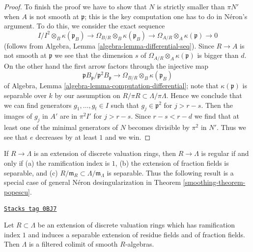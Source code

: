 \begin{proof}
\medskip\noindent
To finish the proof we have to show that $N$ is strictly smaller
than $\pi N'$ when $A$ is not smooth at $\mathfrak p$;
this is the key computation one has to do in N\'eron's argument.
To do this, we consider the exact sequence
$$
I/I^2 \otimes_B \kappa(\mathfrak p_B)
\to \Omega_{B/R} \otimes_B \kappa(\mathfrak p_B)
\to \Omega_{A/R} \otimes_A \kappa(\mathfrak p) \to 0
$$
(follows from Algebra, Lemma \ref{algebra-lemma-differential-seq}).
Since $R \to A$ is not smooth at $\mathfrak p$ we see that the dimension $s$ of
$\Omega_{A/R} \otimes_A \kappa(\mathfrak p)$
is bigger than $d$. On the other hand
the first arrow factors through the injective map
$$
\mathfrak p B_\mathfrak p/\mathfrak p^2 B_\mathfrak p
\to \Omega_{B/R} \otimes_B \kappa(\mathfrak p_B)
$$
of Algebra, Lemma \ref{algebra-lemma-computation-differential};
note that $\kappa(\mathfrak p)$ is separable over $k$
by our assumption on $R/\pi R \subset \Lambda/\pi \Lambda$.
Hence we conclude that we can find generators
$g_1, \ldots, g_t \in I$ such that $g_j \in \mathfrak p^2$
for $j > r - s$. Then the images of $g_j$ in $A'$ are in $\pi^2 I'$
for $j > r - s$. Since $r - s < r - d$
we find that at least one of the minimal generators
of $N$ becomes divisible by $\pi^2$ in $N'$.
Thus we see that $e$ decreases by at least $1$ and we win.
\end{proof}

If $R \to \Lambda$ is an extension of discrete valuation rings,
then $R \to \Lambda$ is regular if and only if
(a) the ramification index is $1$,
(b) the extension of fraction fields is separable, and
(c) $R/\mathfrak m_R \subset \Lambda/\mathfrak m_\Lambda$
is separable. Thus the following result is a special case
of general N\'eron desingularization in
Theorem \ref{smoothing-theorem-popescu}.

\begin{lemma}
\label{smoothing-lemma-neron-colimit}
\href{https://stacks.math.columbia.edu/tag/0BJ7}{\texttt{Stacks tag 0BJ7}}


Let $R \subset \Lambda$ be an extension of discrete valuation
rings which has ramification index $1$ and induces a separable
extension of residue fields and of fraction fields.
Then $\Lambda$ is a filtered colimit of smooth $R$-algebras.
\end{lemma}

